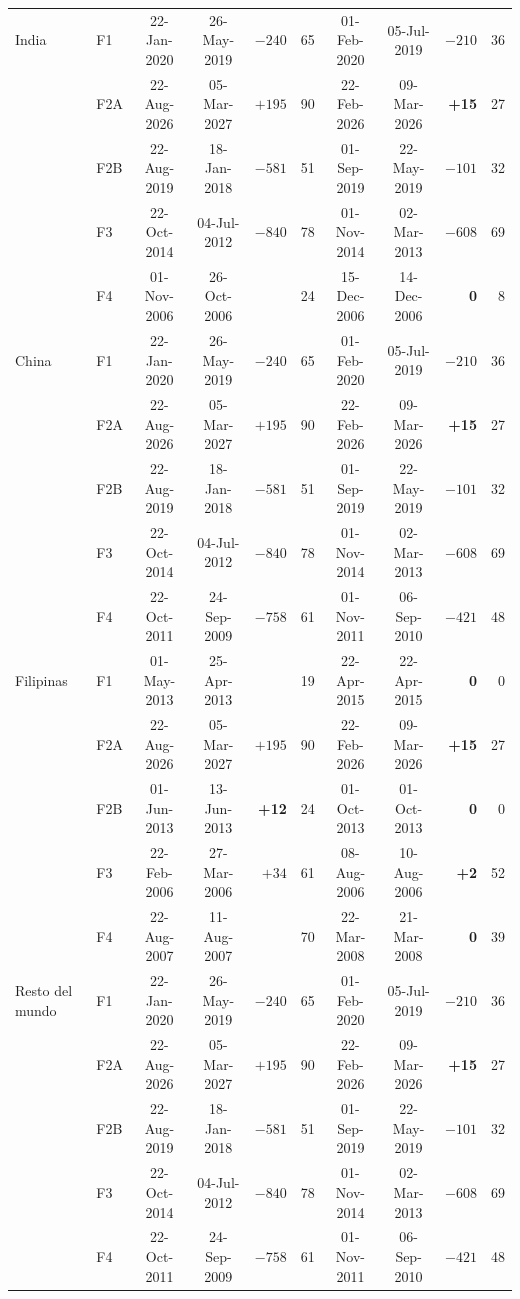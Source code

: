 \documentclass[12pt,letterpaper]{report}
\begin{document}
\begin{table}[htbp]
\begin{tabular}{llccrrccrr}
India & F1 & 22-Jan-2020 & 26-May-2019 & $-240$ & 65 & 01-Feb-2020 & 05-Jul-2019 & $-210$ & 36 \\
 & F2A & 22-Aug-2026 & 05-Mar-2027 & $+195$ & 90 & 22-Feb-2026 & 09-Mar-2026 & \textbf{+15} & 27 \\
 & F2B & 22-Aug-2019 & 18-Jan-2018 & $-581$ & 51 & 01-Sep-2019 & 22-May-2019 & $-101$ & 32 \\
 & F3 & 22-Oct-2014 & 04-Jul-2012 & $-840$ & 78 & 01-Nov-2014 & 02-Mar-2013 & $-608$ & 69 \\
 & F4 & 01-Nov-2006 & 26-Oct-2006 & \textbf{\textminus6} & 24 & 15-Dec-2006 & 14-Dec-2006 & \textbf{0} & 8 \\
China & F1 & 22-Jan-2020 & 26-May-2019 & $-240$ & 65 & 01-Feb-2020 & 05-Jul-2019 & $-210$ & 36 \\
 & F2A & 22-Aug-2026 & 05-Mar-2027 & $+195$ & 90 & 22-Feb-2026 & 09-Mar-2026 & \textbf{+15} & 27 \\
 & F2B & 22-Aug-2019 & 18-Jan-2018 & $-581$ & 51 & 01-Sep-2019 & 22-May-2019 & $-101$ & 32 \\
 & F3 & 22-Oct-2014 & 04-Jul-2012 & $-840$ & 78 & 01-Nov-2014 & 02-Mar-2013 & $-608$ & 69 \\
 & F4 & 22-Oct-2011 & 24-Sep-2009 & $-758$ & 61 & 01-Nov-2011 & 06-Sep-2010 & $-421$ & 48 \\
Filipinas & F1 & 01-May-2013 & 25-Apr-2013 & \textbf{\textminus6} & 19 & 22-Apr-2015 & 22-Apr-2015 & \textbf{0} & 0 \\
 & F2A & 22-Aug-2026 & 05-Mar-2027 & $+195$ & 90 & 22-Feb-2026 & 09-Mar-2026 & \textbf{+15} & 27 \\
 & F2B & 01-Jun-2013 & 13-Jun-2013 & \textbf{+12} & 24 & 01-Oct-2013 & 01-Oct-2013 & \textbf{0} & 0 \\
 & F3 & 22-Feb-2006 & 27-Mar-2006 & $+34$ & 61 & 08-Aug-2006 & 10-Aug-2006 & \textbf{+2} & 52 \\
 & F4 & 22-Aug-2007 & 11-Aug-2007 & \textbf{\textminus10} & 70 & 22-Mar-2008 & 21-Mar-2008 & \textbf{0} & 39 \\
Resto del mundo & F1 & 22-Jan-2020 & 26-May-2019 & $-240$ & 65 & 01-Feb-2020 & 05-Jul-2019 & $-210$ & 36 \\
 & F2A & 22-Aug-2026 & 05-Mar-2027 & $+195$ & 90 & 22-Feb-2026 & 09-Mar-2026 & \textbf{+15} & 27 \\
 & F2B & 22-Aug-2019 & 18-Jan-2018 & $-581$ & 51 & 01-Sep-2019 & 22-May-2019 & $-101$ & 32 \\
 & F3 & 22-Oct-2014 & 04-Jul-2012 & $-840$ & 78 & 01-Nov-2014 & 02-Mar-2013 & $-608$ & 69 \\
 & F4 & 22-Oct-2011 & 24-Sep-2009 & $-758$ & 61 & 01-Nov-2011 & 06-Sep-2010 & $-421$ & 48 \\
\bottomrule
\end{tabular}
\end{table}
\end{document}
